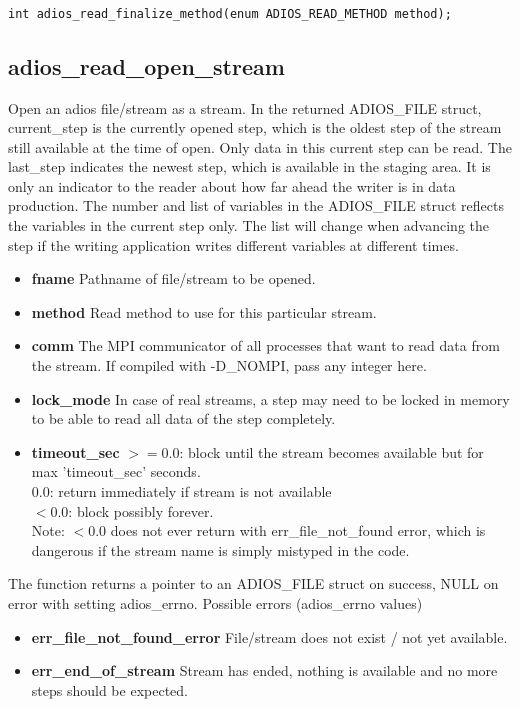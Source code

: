 \begin{lstlisting}[alsolanguage=C]

int adios_read_finalize_method(enum ADIOS_READ_METHOD method);
\end{lstlisting}


\subsection{adios\_read\_open\_stream}
Open an adios file/stream as a stream. In the returned ADIOS\_FILE struct, current\_step is the 
currently opened step, which is the oldest step of the stream still available at the time of open.
Only data in this current step can be read.
The last\_step indicates the newest step, which is available in the staging area. It is only an indicator
to the reader about how far ahead the writer is in data production.  
The number and list of variables in the ADIOS\_FILE struct reflects the variables in the current step only.
The list will change when advancing the step if the writing 
application writes different variables at different times. 

\begin{itemize}
\item{\bf fname}  Pathname of file/stream to be opened.
\item{\bf method}  Read method to use for this particular stream.
\item{\bf comm}    The MPI communicator of all processes that want to read data from the stream.
If compiled with -D\_NOMPI, pass any integer here.
\item{\bf lock\_mode} In case of real streams, a step may need to be locked in memory to be able
to read all data of the step completely.
\item{\bf timeout\_sec}  $>=0.0$: block until the stream becomes available but 
for max 'timeout\_sec' seconds.\\
$0.0$: return immediately if stream is not available\\
$<0.0$: block possibly forever.\\
Note: $<0.0$ does not ever return with err\_file\_not\_found error, 
which is dangerous if the stream name is simply mistyped in the code.
\end{itemize}

\noindent The function returns a pointer to an ADIOS\_FILE struct on success, NULL on error with setting adios\_errno. 
Possible errors (adios\_errno values)

\begin{itemize}
\item{\bf err\_file\_not\_found\_error}  File/stream does not exist / not yet available.
\item{\bf err\_end\_of\_stream}  Stream has ended, nothing is available and no more steps should be expected.
\end{itemize}


